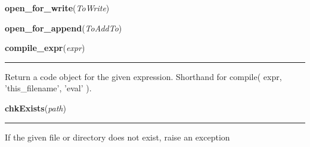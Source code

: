     \vspace{0.5ex}

\hspace{.8\funcindent}\begin{boxedminipage}{\funcwidth}

    \raggedright \textbf{open\_for\_write}(\textit{ToWrite})

\setlength{\parskip}{2ex}
\setlength{\parskip}{1ex}
    \end{boxedminipage}

    \label{System:Utils:open_for_append}

    \vspace{0.5ex}

\hspace{.8\funcindent}\begin{boxedminipage}{\funcwidth}

    \raggedright \textbf{open\_for\_append}(\textit{ToAddTo})

\setlength{\parskip}{2ex}
\setlength{\parskip}{1ex}
    \end{boxedminipage}

    \label{System:Utils:compile_expr}

    \vspace{0.5ex}

\hspace{.8\funcindent}\begin{boxedminipage}{\funcwidth}

    \raggedright \textbf{compile\_expr}(\textit{expr})

    \vspace{-1.5ex}

    \rule{\textwidth}{0.5\fboxrule}
\setlength{\parskip}{2ex}
    Return a code object for the given expression.  Shorthand for compile( 
    expr, 'this\_filename', 'eval' ).

\setlength{\parskip}{1ex}
    \end{boxedminipage}

    \label{System:Utils:chkExists}

    \vspace{0.5ex}

\hspace{.8\funcindent}\begin{boxedminipage}{\funcwidth}

    \raggedright \textbf{chkExists}(\textit{path})

    \vspace{-1.5ex}

    \rule{\textwidth}{0.5\fboxrule}
\setlength{\parskip}{2ex}
    If the given file or directory does not exist, raise an exception

\setlength{\parskip}{1ex}
    \end{boxedminipage}

